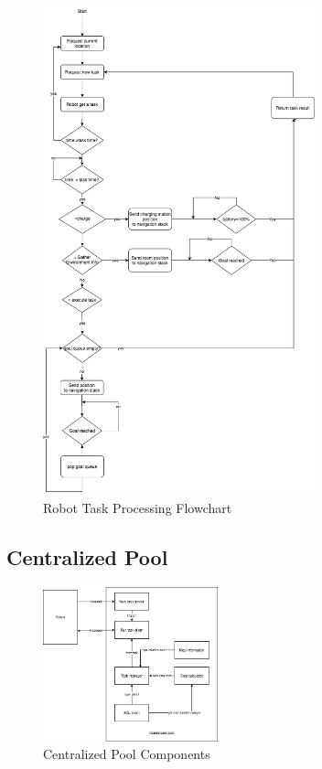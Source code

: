 \begin{figure}[htbp]
    \centering
    \includegraphics[width = 0.7\textwidth]{content/images/ch4/robot_task_flow.drawio.png}
    \caption{Robot Task Processing Flowchart}
    \label{fig:robot_task_processing}
\end{figure}


\subsection{Centralized Pool}

\begin{figure}[htbp]
	\centering
	\includegraphics[width = 0.45\textwidth]{content/images/ch4/system_component_centralized_pool.drawio.png}
	\caption{Centralized Pool Components}
	\label{fig:centralized_pool_components}
\end{figure}

